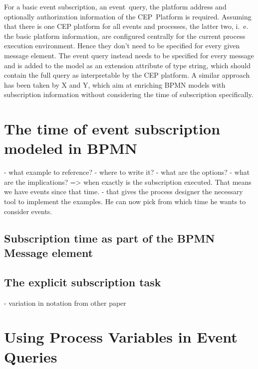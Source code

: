 For a basic event subscription, an event~query, the platform address and optionally authorization information of the CEP~Platform is required. 
Assuming that there is one CEP platform for all events and processes, the latter two, i.~e. the basic platform information, are configured centrally for the current process execution environment. Hence they don't need to be specified for every given message element. 
The event query instead needs to be specified for every message and is added to the model as an extension attribute of type string, which should contain the full query as interpretable by the CEP platform.
A similar approach has been taken by X and Y, which aim at enriching BPMN models with subscription information without considering the time of subscription specifically.


\section{The time of event subscription modeled in BPMN}
- what example to reference?
- where to write it?
- what are the options?
- what are the implications? => when exactly is the subscription executed. That means we have events since that time.
- that gives the process designer the necessary tool to implement the examples. He can now pick from which time he wants to consider events.



\subsection{Subscription time as part of the BPMN Message element}

\subsection{The explicit subscription task}
- variation in notation from other paper

\section{Using Process Variables in Event Queries}

